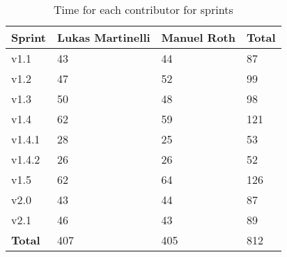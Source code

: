 \begin{table}[H]
\centering
    \begin{tabular}{llll}
    \textbf{Sprint}  & \textbf{Lukas Martinelli} & \textbf{Manuel Roth} & \textbf{Total} \\
    \hline
    v1.1    & 43               & 44          & 87    \\
    v1.2    & 47               & 52          & 99    \\
    v1.3    & 50               & 48          & 98    \\
    v1.4    & 62               & 59          & 121   \\
    v1.4.1  & 28               & 25          & 53   \\
    v1.4.2  & 26               & 26          & 52   \\
    v1.5    & 62               & 64          & 126   \\
    v2.0    & 43               & 44          & 87    \\
    v2.1    & 46               & 43          & 89    \\
    \hline
    \textbf{Total}          & 407              & 405         & 812   \\
    \end{tabular}
    \caption{Time for each contributor for sprints}
\end{table}